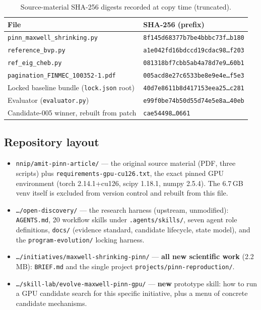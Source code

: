 \documentclass[11pt,a4paper]{article}
\newcommand{\code}[1]{\texttt{\small #1}}
\begin{document}
\begin{table}[ht]
\centering
\caption{Source-material SHA-256 digests recorded at copy time (truncated).}
\label{tab:prov}
\small
\begin{tabular}{@{}ll@{}}
\toprule
\textbf{File} & \textbf{SHA-256 (prefix)} \\
\midrule
\code{pinn\_maxwell\_shrinking.py} & \code{8f145d68377b7be4bbbc73f\ldots b180} \\
\code{reference\_bvp.py}           & \code{a1e042fd16bdccd19cdac98\ldots f203} \\
\code{ref\_eig\_cheb.py}           & \code{081318bf7cbb5ab4a78d7e9\ldots 60b1} \\
\code{pagination\_FINMEC\_100352-1.pdf} & \code{005acd8e27c6533be8e9e4e\ldots f5e3} \\
\midrule
Locked baseline bundle (\code{lock.json} root) & \code{40d7e8611b8d417153eea25\ldots c281} \\
Evaluator (\code{evaluator.py})               & \code{e99f0be74b50d55d74e5e8a\ldots 40eb} \\
Candidate-005 winner, rebuilt from patch      & \code{cae54498\ldots 0661} \\
\bottomrule
\end{tabular}
\end{table}

\subsection{Repository layout}
\begin{itemize}[leftmargin=1.4em,itemsep=1pt]
  \item \code{nnip/amit-pinn-article/} --- the original source material (PDF, three
        scripts) plus \code{requirements-gpu-cu126.txt}, the exact pinned GPU environment
        (torch 2.14.1+cu126, scipy 1.18.1, numpy 2.5.4). The 6.7\,GB venv itself is
        excluded from version control and rebuilt from this file.
  \item \code{\ldots/open-discovery/} --- the research harness (upstream, unmodified):
        \code{AGENTS.md}, 20 workflow skills under \code{.agents/skills/}, seven agent
        role definitions, \code{docs/} (evidence standard, candidate lifecycle,
        state model), and the \code{program-evolution/} locking harness.
  \item \code{\ldots/initiatives/maxwell-shrinking-pinn/} --- \textbf{all new scientific
        work} (2.2\,MB): \code{BRIEF.md} and the single project
        \code{projects/pinn-reproduction/}.
  \item \code{\ldots/skill-lab/evolve-maxwell-pinn-gpu/} --- \textbf{new} prototype skill:
        how to run a GPU candidate search for this specific initiative, plus a menu of
        concrete candidate mechanisms.
\end{itemize}
\end{document}
